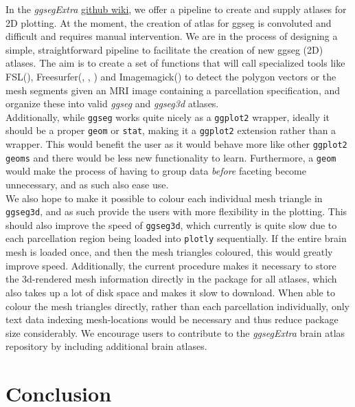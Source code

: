 \documentclass[fleqn,10pt]{wlpeerj} %
\begin{document}
In the \emph{ggsegExtra} \href{https://github.com/LCBC-UiO/ggsegExtra/wiki/Contributing\%3A-polygon-atlases-new}{github wiki}, we offer a pipeline to create and supply atlases for 2D plotting.
At the moment, the creation of atlas for ggseg is convoluted and difficult and requires manual intervention.
We are in the process of designing a simple, straightforward pipeline to facilitate the creation of new ggseg (2D) atlases.
The aim is to create a set of functions that will call specialized tools like FSL(\citet{fsl}), Freesurfer(\citet{fischl_99}, \citet{dale_99}, \citet{Fischl2000}) and Imagemagick(\citet{magick}) to detect the polygon vectors or the mesh segments given an MRI image containing a parcellation specification, and organize these into valid \emph{ggseg} and \emph{ggseg3d} atlases.\\
Additionally, while \texttt{ggseg} works quite nicely as a \texttt{ggplot2} wrapper, ideally it should be a proper \texttt{geom} or \texttt{stat}, making it a \texttt{ggplot2} extension rather than a wrapper.
This would benefit the user as it would behave more like other \texttt{ggplot2} \texttt{geoms} and there would be less new functionality to learn.
Furthermore, a \texttt{geom} would make the process of having to group data \emph{before} faceting become unnecessary, and as such also ease use.\\
We also hope to make it possible to colour each individual mesh triangle in \texttt{ggseg3d}, and as such provide the users with more flexibility in the plotting.
This should also improve the speed of \texttt{ggseg3d}, which currently is quite slow due to each parcellation region being loaded into \texttt{plotly} sequentially.
If the entire brain mesh is loaded once, and then the mesh triangles coloured, this would greatly improve speed.
Additionally, the current procedure makes it necessary to store the 3d-rendered mesh information directly in the package for all atlases, which also takes up a lot of disk space and makes it slow to download.
When able to colour the mesh triangles directly, rather than each parcellation individually, only text data indexing mesh-locations would be necessary and thus reduce package size considerably.
We encourage users to contribute to the \emph{ggsegExtra} brain atlas repository by including additional brain atlases.

\hypertarget{conclusion}{%
\section{Conclusion}\label{conclusion}}
\end{document}
